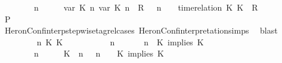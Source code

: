 \begin{isabellebody}
\ \ \ \ \ \ \ {\isacartoucheopen}{\isacharparenleft}{\isasymGamma}\ n\ {\isasymturnstile}\ {\isasymPsi}\ {\isasymtriangleright}\ {\isasymPhi}\ {\isacharequal}\ {\isacharparenleft}{\isacharparenleft}{\isacharparenleft}{\isasymlfloor}{\isasymtau}\isactrlsub v\isactrlsub a\isactrlsub r\ {\isacharparenleft}K\ n{\isacharparenright}{\isacharcomma}\ {\isasymtau}\isactrlsub v\isactrlsub a\isactrlsub r\ {\isacharparenleft}K\ n{\isacharparenright}{\isasymrfloor}\ {\isasymin}\ R{\isacharparenright}\ {\isacharhash}\ {\isasymGamma}{\isacharparenright}{\isacharcomma}\ n\ {\isasymturnstile}\ {\isasymPsi}\ {\isasymtriangleright}\ {\isacharparenleft}{\isacharparenleft}time{\isacharminus}relation\ {\isasymlfloor}K\ K\ {\isasymin}\ R{\isacharparenright}\ {\isacharhash}\ {\isasymPhi}{\isacharparenright}{\isacharparenright}{\isacartoucheclose}\isanewline
\ \ \ \ \ \ \isamarkupfalse%
\ {\isacharquery}P\isanewline
\ \ \ \ \ \ \ \ \isamarkupfalse%
\ HeronConf{\isacharunderscore}interp{\isacharunderscore}stepwise{\isacharunderscore}tagrel{\isacharunderscore}cases\ HeronConf{\isacharunderscore}interpretation{\isachardot}simps\ \isamarkupfalse%
\ blast\isanewline
\ \ \ \ \isamarkupfalse%
\isanewline
\ \ \ \ \ \ \isamarkupfalse%
\ {\isasymGamma}\ n\ K\ K\ {\isasymPsi}\ {\isasymPhi}\isanewline
\ \ \ \ \ \ \isamarkupfalse%
\ {\isacartoucheopen}{\isacharparenleft}{\isasymGamma}\ n\ {\isasymturnstile}\ {\isasymPsi}\ {\isasymtriangleright}\ {\isasymPhi}\ {\isacharequal}\ {\isacharparenleft}{\isasymGamma}{\isacharcomma}\ n\ {\isasymturnstile}\ {\isacharparenleft}K\ implies\ K\ {\isacharhash}\ {\isasymPsi}\ {\isasymtriangleright}\ {\isasymPhi}{\isacharparenright}{\isacartoucheclose}\isanewline
\ \ \ \ \ \ \ {\isacartoucheopen}{\isacharparenleft}{\isasymGamma}\ n\ {\isasymturnstile}\ {\isasymPsi}\ {\isasymtriangleright}\ {\isasymPhi}\ {\isacharequal}\ {\isacharparenleft}{\isacharparenleft}{\isacharparenleft}K\ {\isasymnot}{\isasymUp}\ n{\isacharparenright}\ {\isacharhash}\ {\isasymGamma}{\isacharparenright}{\isacharcomma}\ n\ {\isasymturnstile}\ {\isasymPsi}\ {\isasymtriangleright}\ {\isacharparenleft}{\isacharparenleft}K\ implies\ K\ {\isacharhash}\ {\isasymPhi}{\isacharparenright}{\isacharparenright}{\isacartoucheclose}\isanewline

\end{isabellebody}
